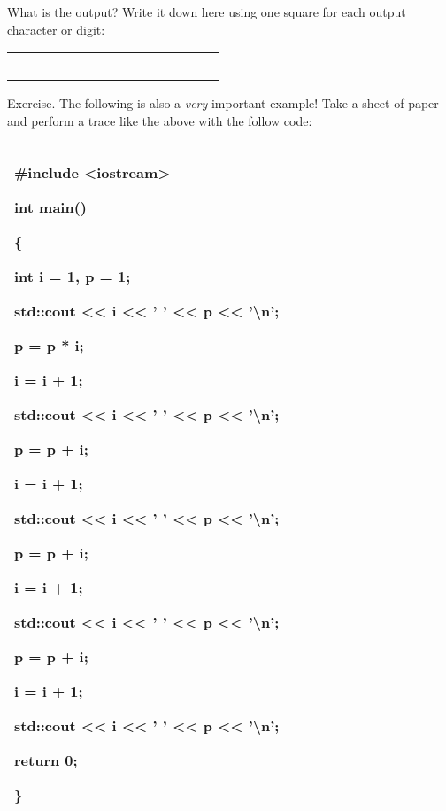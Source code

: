 \documentclass[
]{article}
\begin{document}
What is the output? Write it down here using one square for each output
character or digit:

\begin{longtable}[]{@{}lllllllllllllll@{}}
\toprule
\endhead
& & & & & & & & & & & & & &\tabularnewline
& & & & & & & & & & & & & &\tabularnewline
& & & & & & & & & & & & & &\tabularnewline
& & & & & & & & & & & & & &\tabularnewline
& & & & & & & & & & & & & &\tabularnewline
\bottomrule
\end{longtable}

Exercise. The following is also a \emph{very} important example! Take a
sheet of paper and perform a trace like the above with the follow code:

\begin{longtable}[]{@{}l@{}}
\toprule
\endhead
\begin{minipage}[t]{0.97\columnwidth}\raggedright
\#include \textless iostream\textgreater{}

int main()

\{

int i = 1, p = 1;

std::cout \textless\textless{} i \textless\textless{} ' '
\textless\textless{} p \textless\textless{} '\textbackslash n';

p = p * i;

i = i + 1;

std::cout \textless\textless{} i \textless\textless{} ' '
\textless\textless{} p \textless\textless{} '\textbackslash n';

p = p + i;

i = i + 1;

std::cout \textless\textless{} i \textless\textless{} ' '
\textless\textless{} p \textless\textless{} '\textbackslash n';

p = p + i;

i = i + 1;

std::cout \textless\textless{} i \textless\textless{} ' '
\textless\textless{} p \textless\textless{} '\textbackslash n';

p = p + i;

i = i + 1;

std::cout \textless\textless{} i \textless\textless{} ' '
\textless\textless{} p \textless\textless{} '\textbackslash n';

return 0;

\}\strut
\end{minipage}\tabularnewline
\bottomrule
\end{longtable}
\end{document}
